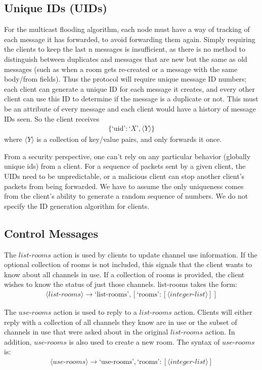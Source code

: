 \documentclass{article}
\begin{document}
\subsection{Unique IDs (UIDs)}
For the multicast flooding algorithm, each node must have a way of tracking of
each message it has forwarded, to avoid forwarding them again. Simply requiring
the clients to keep the last n messages is insufficient, as there is no method
to distinguish between duplicates and messages that are new but the same as old
messages (such as when a room gets re-created or a message with the same
body/from fields). Thus the protocol will require unique message ID numbers;
each client can generate a unique ID for each message it creates, and every
other client can use this ID to determine if the message is a duplicate or not.
This must be an attribute of every message and each client would have a history
of message IDs seen. So the client receives
\begin{align*}
\{\text{`uid'}:\text{`}X\text{'},\langle Y\rangle\}
\end{align*}
where $\langle Y\rangle$  is a collection of key/value pairs, and only forwards
it once.

From a security perspective, one can't rely on any particular behavior (globally
unique ids) from a client. For a sequence of packets sent by a given client, the
UIDs need to be unpredictable, or a malicious client can stop another client's
packets from being forwarded. We have to assume the only uniqueness comes from
the client's ability to generate a random sequence of numbers. We do not specify
the ID generation algorithm for clients.
\subsection{Control Messages}

The $list\text{-}rooms$ action is used by clients to update channel use information. If
the optional collection of rooms is not included, this signals that the client
wants to know about all channels in use. If a collection of rooms is provided,
the client wishes to know the status of just those channels. list-rooms takes
the form:
\begin{align*}
\langle list\text{-}rooms\rangle  \rightarrow \text{`list-rooms'} , [ \text{`rooms'} :
[\langle integer\text{-}list\rangle ] ]
\end{align*}

The $use\text{-}rooms$ action is used to reply to a $list\text{-}rooms$ action. Clients will
either reply with a collection of all channels they know are in use or the
subset of channels in use that were asked about in the original
$list\text{-}rooms$
action. In addition, $use\text{-}rooms$ is also used to create a new room. The
syntax of $use\text{-}rooms$ is:
\begin{align*}
\langle use\text{-}rooms\rangle \rightarrow \text{`use-rooms'}, \text{`rooms'} :
[\langle integer\text{-}list\rangle ]
\end{align*}
\end{document}
